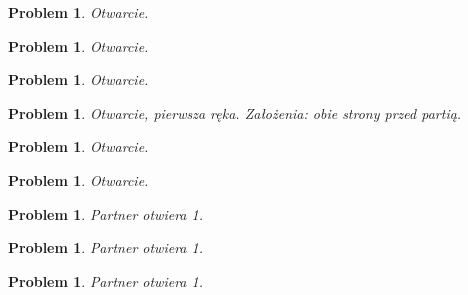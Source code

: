 \documentclass[12pt, a4paper]{article}
\author{}
\date{}
\newtheorem{problem}[table]{Problem}
\begin{document}
\begin{problem}
    Otwarcie.
\end{problem}
\begin{center}
\end{center}

\begin{problem}
    Otwarcie.
\end{problem}
\begin{center}
\end{center}

\begin{problem}
    Otwarcie.
\end{problem}
\begin{center}
\end{center}

\begin{problem}
    Otwarcie, pierwsza ręka. Założenia: obie strony przed partią.
\end{problem}
\begin{center}
\end{center}

\begin{problem}
    Otwarcie.
\end{problem}
\begin{center}
\end{center}

\begin{problem}
    Otwarcie.
\end{problem}
\begin{center}
\end{center}




\begin{problem}
    Partner otwiera \emph{1\hearts}.
\end{problem}
\begin{center}
\end{center}

\begin{problem}
    Partner otwiera \emph{1\clubs}.
\end{problem}
\begin{center}
\end{center}

\begin{problem}
    Partner otwiera \emph{1\spades}.
\end{problem}
\begin{center}
\end{center}
\end{document}
